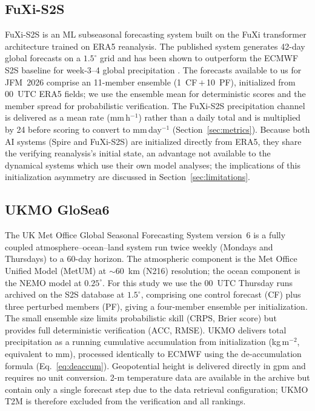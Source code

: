 \documentclass[11pt,a4paper]{article}
\begin{document}
\subsection{FuXi-S2S}\label{sec:fuxi}

FuXi-S2S \citep{chen2024} is an ML subseasonal forecasting system built on
the FuXi transformer architecture trained on ERA5 reanalysis. The published
system generates 42-day global forecasts on a $1.5^{\circ}$ grid and has been
shown to outperform the ECMWF S2S baseline for week-3--4 global precipitation
\citep{chen2024}. The forecasts available to us for JFM~2026 comprise an
11-member ensemble (1~CF\,$+$\,10~PF), initialized from 00~UTC ERA5 fields;
we use the ensemble mean for deterministic scores and the member spread for
probabilistic verification. The FuXi-S2S precipitation channel is delivered
as a mean rate (mm\,h$^{-1}$) rather than a daily total and is multiplied by
24 before scoring to convert to mm\,day$^{-1}$ (Section~\ref{sec:metrics}).
Because both AI systems (Spire and FuXi-S2S) are initialized directly from
ERA5, they share the verifying reanalysis's initial state, an advantage not
available to the dynamical systems which use their own model analyses; the
implications of this initialization asymmetry are discussed in
Section~\ref{sec:limitations}.

\subsection{UKMO GloSea6}\label{sec:ukmo}

The UK Met Office Global Seasonal Forecasting System version~6
\citep[GloSea6;][]{maclauchlan2014} is a fully coupled atmosphere--ocean--land
system run twice weekly (Mondays and Thursdays) to a 60-day horizon. The
atmospheric component is the Met Office Unified Model (MetUM) at $\sim$60~km
(N216) resolution; the ocean component is the NEMO model at $0.25^\circ$.
For this study we use the 00~UTC Thursday runs archived on the S2S database at
$1.5^\circ$, comprising one control forecast (CF) plus three perturbed members (PF),
giving a four-member ensemble per initialization. The small ensemble size limits
probabilistic skill (CRPS, Brier score) but provides full deterministic
verification (ACC, RMSE). UKMO delivers total precipitation as a running cumulative
accumulation from initialization (kg\,m$^{-2}$, equivalent to mm), processed
identically to ECMWF using the de-accumulation formula (Eq.~\ref{eq:deaccum}).
Geopotential height is delivered directly in gpm and requires no unit conversion.
2-m temperature data are available in the archive but contain only a single forecast
step due to the data retrieval configuration; UKMO T2M is therefore excluded from
the verification and all rankings.
\end{document}
